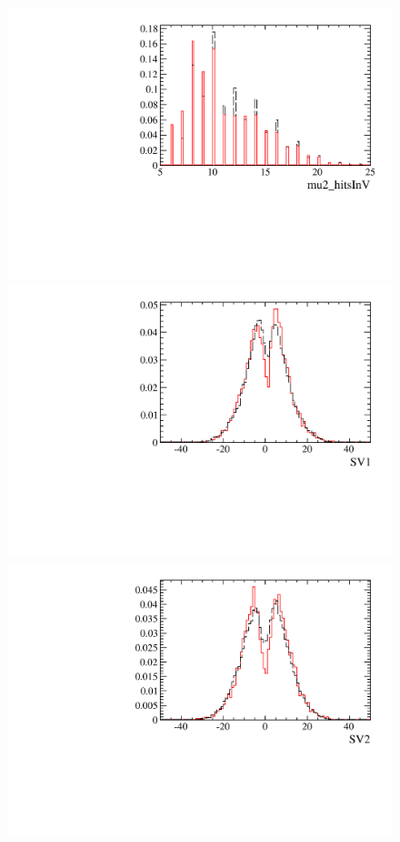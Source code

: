 \documentclass[12pt,a4paper]{article}
\begin{document}
\begin{figure} [htb!]
\begin{center}
\includegraphics[scale=0.20]{figs/mu2_hitsInVPARTIALptcut.pdf}
\includegraphics[scale=0.20]{figs/SV1PARTIALptcut.pdf}
\includegraphics[scale=0.20]{figs/SV2PARTIALptcut.pdf}

\end{center}
\end{figure}
\end{document}
